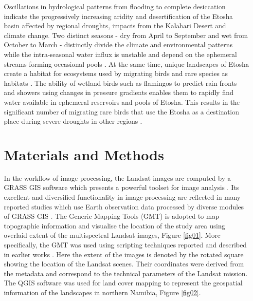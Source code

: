 \documentclass[climate,article,submit,pdftex,moreauthors]{Definitions/mdpi}
\begin{document}
Oscillations in hydrological patterns from flooding to complete desiccation indicate the progressively increasing aridity and desertification of the Etosha basin affected by regional droughts, impacts from the Kalahari Desert and climate change. Two distinct seasons - dry from April to September and wet from October to March - distinctly divide the climate and environmental patterns while the intra-seasonal water influx is unstable and depend on the ephemeral streams forming occasional pools \cite{Himmelsbach}. At the same time, unique landscapes of Etosha create a habitat for ecosystems used by migrating birds and rare species as habitats \cite{Fox,LeRoux,Berry}. The ability of wetland birds such as flamingos to predict rain fronts and showers using changes in pressure gradients enables them to rapidly find water available in ephemeral reservoirs and pools of Etosha. This results in the significant number of migrating rare birds that use the Etosha as a destination place during severe droughts in other regions \cite{Simmons}. 

\section{Materials and Methods}
 
In the workflow of image processing, the Landsat images are computed by a GRASS GIS software which presents a powerful toolset for image analysis \cite{GRASS_GIS_software}. Its excellent and diversified functionality in image processing are reflected in many reported studies which use Earth observation data processed by diverse modules of GRASS GIS \cite{HOFIERKA2009387,lemenkova2024exploitation,Lemenkova202320,ROCCHINI201382,Lemenkova202313,JASIEWICZ20111162}. The Generic Mapping Tools (GMT) \cite{Wessel} is adopted to map topographic information and visualise the location of the study area using overlaid extent of the multispectral Landsat images, Figure \ref{fig01}. More specifically, the GMT was used using scripting techniques reported and described in earlier works \cite{Lemenkova202203,Lemenkova202217}. Here the extent of the images is denoted by the rotated square showing the location of the Landsat scenes. Their coordinates were derived from the metadata and correspond to the technical parameters of the Landsat mission. The QGIS software was used for land cover mapping to represent the geospatial information of the landscapes in northern Namibia, Figure \ref{fig02}. 
\end{document}
